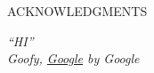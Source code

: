 
ACKNOWLEDGMENTS

\vspace*{5\baselineskip}

\begin{flushright}
    \textit{``HI''\\
    Goofy, \href{https://google.com}{Google} by Google}
\end{flushright}
